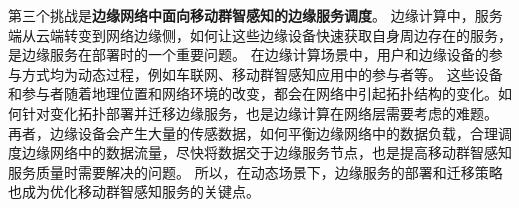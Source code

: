 
第三个挑战是\textbf{边缘网络中面向移动群智感知的边缘服务调度}。
边缘计算中，服务端从云端转变到网络边缘侧，如何让这些边缘设备快速获取自身周边存在的服务，是边缘服务在部署时的一个重要问题。
在边缘计算场景中，用户和边缘设备的参与方式均为动态过程，例如车联网、移动群智感知应用中的参与者等。
这些设备和参与者随着地理位置和网络环境的改变，都会在网络中引起拓扑结构的变化。如何针对变化拓扑部署并迁移边缘服务，也是边缘计算在网络层需要考虑的难题。
再者，边缘设备会产生大量的传感数据，如何平衡边缘网络中的数据负载，合理调度边缘网络中的数据流量，尽快将数据交于边缘服务节点，也是提高移动群智感知服务质量时需要解决的问题。
所以，在动态场景下，边缘服务的部署和迁移策略也成为优化移动群智感知服务的关键点。












